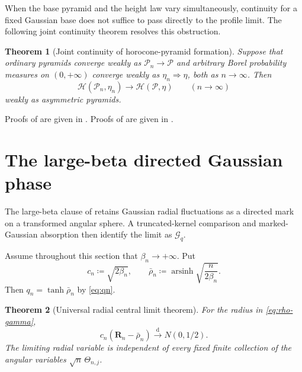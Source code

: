 \documentclass{amsart}
\numberwithin{equation}{section}
\theoremstyle{plain}
\newtheorem{theorem}{Theorem}[section]
\theoremstyle{definition}
\theoremstyle{remark}
\DeclareMathOperator{\arsinh}{arsinh}
\begin{document}
When the base pyramid and the height law vary simultaneously, continuity for a fixed Gaussian base does not suffice to
pass directly to the profile limit.  The following joint continuity theorem resolves this obstruction.

\begin{theorem}[Joint continuity of horocone-pyramid formation]
\label{thm:joint-horocone-pyramid-continuity}
Suppose that ordinary pyramids converge weakly as $\mathcal P_n\to\mathcal P$ and arbitrary Borel probability measures on
$(0,+\infty)$ converge weakly as $\eta_n\Rightarrow\eta$, both as $n\to\infty$.  Then
\begin{equation}\label{eq:joint-horocone-pyramid-continuity}
 \mathcal H(\mathcal P_n,\eta_n)
 \longrightarrow\mathcal H(\mathcal P,\eta)
 \qquad(n\to\infty)
\end{equation}
weakly as asymmetric pyramids.
\end{theorem}

Proofs of
are given in .  Proofs of
 are given in
.

\section{The large-beta directed Gaussian phase}\label{sec:large-beta}

The large-beta clause of  retains Gaussian radial fluctuations as a directed mark on a transformed angular sphere.  A truncated-kernel comparison and marked-Gaussian absorption then identify the limit as $\mathcal G_q$.

Assume throughout this section that $\beta_n\to+\infty$.  Put
\begin{equation}\label{eq:large-beta-reference} c_n\coloneqq\sqrt{2\beta_n}, \qquad \bar\rho_n\coloneqq\arsinh\sqrt{\frac{n}{2\beta_n}}. \end{equation}
Then $q_n=\tanh\bar\rho_n$ by \eqref{eq:qn}.

\begin{theorem}[Universal radial central limit theorem]\label{thm:radial-clt}
For the radius in \eqref{eq:rho-gamma},
\begin{equation}\label{eq:radial-clt} c_n(\mathbf R_n-\bar\rho_n)\overset{\mathrm{d}}{\longrightarrow} N(0,1/2). \end{equation}
The limiting radial variable is independent of every fixed finite collection of the angular variables $\sqrt n\,\Theta_{n,j}$.
\end{theorem}
\end{document}
